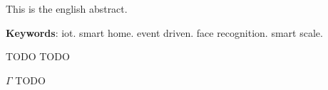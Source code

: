 \documentclass[
12pt,        %
openright,   %
twoside,     %
a4paper,     %
brazil,       %
english       %
%
%
]{ppgca}
\begin{document}



\begin{resumo}[Abstract]
   This is the english abstract.

   \vspace{\onelineskip}

   \noindent \textbf{Keywords}: iot. smart home. event driven. face recognition. smart scale.
\end{resumo}


\listoffigures*
\cleardoublepage


\listoftables*
\cleardoublepage

\begin{siglas}
  \item[TODO] TODO
\end{siglas}

\begin{simbolos}
  \item[$ \Gamma $] TODO
\end{simbolos}

\tableofcontents*
\cleardoublepage
\textual
\end{document}
